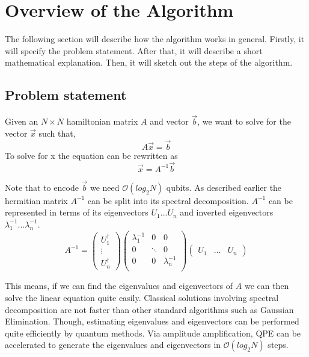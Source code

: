 \section{ Overview of the Algorithm}
The following section will describe how the algorithm works in general.
Firstly, it will specify the problem statement. 
After that, it will describe a short mathematical explanation. 
Then, it will sketch out the steps of the algorithm.

\subsection{Problem statement}

Given an $N\times N$ hamiltonian matrix $A$ and vector $\vec b$, we want to solve for the vector $\vec x$ such that,
\begin{equation}
A \vec{x} = \vec{b}
\end{equation}
To solve for x the equation can be rewritten as
\begin{equation}
\vec{x} = A^{-1}\vec{b}
\end{equation}

Note that to encode $\vec b$ we need $\mathcal{O}(log_2 N)$ qubits.
As described earlier the hermitian matrix $A^{-1}$ can be split into its spectral decomposition. 
$A^{-1}$ can be represented in terms of its eigenvectors $U_1 ... U_n$ and inverted eigenvectors $\lambda_1^{-1 } ... \lambda_n^{-1}$.
\begin{equation} 
 A^{-1} = \begin{pmatrix} U^\dagger_1 \\ \vdots \\ U^\dagger_n \end{pmatrix}
\begin{pmatrix} \lambda_1^{-1} & 0 & 0\\ 0 & \ddots & 0\\ 0 & 0& \lambda_n^{-1} \\ \end{pmatrix}
\begin{pmatrix} U_1 & \dots & U_n \end{pmatrix} 
\end{equation}

This means, if we can find the eigenvalues and eigenvectors of $A$ we can then solve the linear equation quite easily. 
Classical solutions involving spectral decomposition are not faster than other standard algorithms such as Gaussian Elimination. 
Though, estimating eigenvalues and eigenvectors can be performed quite efficiently by quantum methods.
Via amplitude amplification, QPE can be accelerated to generate the eigenvalues and eigenvectors in $\mathcal{O}(log_2 N)$ steps.

